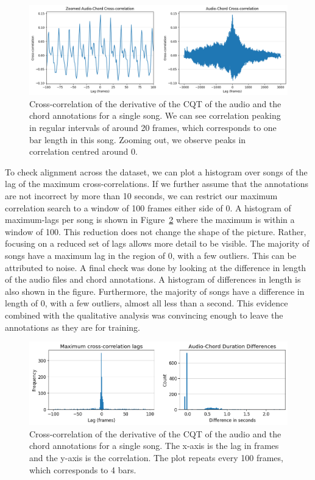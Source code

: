 \begin{figure}[H]
    \centering
    \includegraphics[width=1.0\textwidth]{figures/cross_correlation.png}
    \caption{Cross-correlation of the derivative of the CQT of the audio and the chord annotations for a single song. We can see correlation peaking in regular intervals of around 20 frames, which corresponds to one bar length in this song. Zooming out, we observe peaks in correlation centred around 0.}\label{fig:cross-correlation}
\end{figure}

To check alignment across the dataset, we can plot a histogram over songs of the lag of the maximum cross-correlations. If we further assume that the annotations are not incorrect by more than 10 seconds, we can restrict our maximum correlation search to a window of 100 frames either side of 0. A histogram of maximum-lags per song is shown in Figure~\ref{fig:durations-and-lags} where the maximum is within a window of 100. This reduction does not change the shape of the picture. Rather, focusing on a reduced set of lags allows more detail to be visible. The majority of songs have a maximum lag in the region of 0, with a few outliers. This can be attributed to noise. A final check was done by looking at the difference in length of the audio files and chord annotations. A histogram of differences in length is also shown in the figure. Furthermore, the majority of songs have a difference in length of 0, with a few outliers, almost all less than a second. This evidence combined with the qualitative analysis was convincing enough to leave the annotations as they are for training.

\begin{figure}[H]
    \centering
    \includegraphics[width=1.0\textwidth]{figures/duration_diffs_and_lags.png}
    \caption{Cross-correlation of the derivative of the CQT of the audio and the chord annotations for a single song. The x-axis is the lag in frames and the y-axis is the correlation. The plot repeats every 100 frames, which corresponds to 4 bars.}\label{fig:durations-and-lags}
\end{figure}

